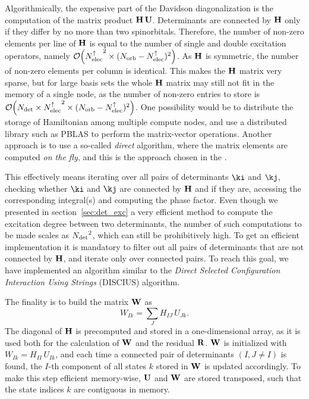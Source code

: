 \documentclass[./thesis.tex]{subfiles}
\begin{document}
Algorithmically, the expensive part of the Davidson diagonalization is the computation of the matrix product $\mathbf{H}\, \mathbf{U}$.
Determinants are connected by $\mathbf{H}$ only if they differ by no more than two
spinorbitals. Therefore, the number of non-zero elements per line of $\mathbf{H}$ is
equal to the number of single and double excitation operators, namely
$\order{\Nalpha^2 \times (\Norb - \Nalpha)^2}$. As $\mathbf{H}$ is symmetric, the number
of non-zero elements per column is identical. This makes the $\mathbf{H}$ matrix very
sparse, but for large basis sets the whole $\mathbf{H}$ matrix may still not fit in the
memory of a single node, as the number of non-zero entries to store is
$\order{\Ndet \times \Nalpha^2 \times (\Norb - \Nalpha)^2}$.  One possibility
would be to distribute the storage of Hamiltonian among multiple compute nodes,
and use a distributed library such as PBLAS\cite{pblas} to perform the
matrix-vector operations. Another approach is to use a so-called \emph{direct}
algorithm, where the matrix elements are computed \emph{on the fly}, and this
is the approach chosen in the \QP.


This effectively means iterating over all pairs of determinants $\ki$ and
$\kj$, checking whether $\ki$ and $\kj$ are connected by $\mathbf{H}$ and if they are,
accessing the corresponding integral(s) and computing the phase factor. Even
though we presented in section~\ref{sec:det_exc} a very efficient method to
compute the excitation degree
between two determinants, the number of such computations to be made scales as
${N_\text{det}}^2$, which can still be prohibitively high. To get an efficient
implementation it is mandatory to filter out all pairs of determinants that are
not connected by $\mathbf{H}$, and iterate only over connected pairs. To reach this
goal, we have implemented an algorithm similar to the \emph{Direct Selected
Configuration Interaction Using Strings} (DISCIUS)
algorithm.\cite{Povill_1995}

The finality is to build the matrix $\mathbf{W}$ as
\begin{equation}
W_{Ik} = \sum_J H_{IJ}\, U_{Jk}.
\label{eq:whu}
\end{equation}
The diagonal of $\mathbf{H}$ is precomputed and stored in a one-dimensional array, as it is
used both for the calculation of $\mathbf{W}$ and the residual $\mathbf{R}$.
$\mathbf{W}$ is initialized with $W_{Ik} = H_{II}\, U_{Ik}$, and
each time a connected pair of determinants $(I, J \neq I)$ is found, the $I$-th component of all states $k$ stored in $\mathbf{W}$ is updated accordingly. To make this step efficient memory-wise, $\mathbf{U}$ and $\mathbf{W}$ are stored transposed, such that the state indices $k$ are contiguous in memory.
\end{document}
